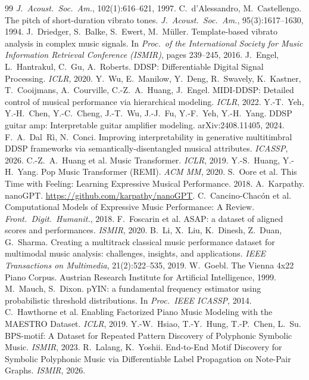\documentclass[11pt,a4paper]{report}
\begin{document}
\begin{thebibliography}{99}
\emph{J.\ Acoust.\ Soc.\ Am.}, 102(1):616--621, 1997.
 C.~d'Alessandro, M.~Castellengo.
The pitch of short-duration vibrato tones.
\emph{J.\ Acoust.\ Soc.\ Am.}, 95(3):1617--1630, 1994.
 J.~Driedger, S.~Balke, S.~Ewert, M.~M\"uller.
Template-based vibrato analysis in complex music signals.
In \emph{Proc.\ of the International Society for Music Information Retrieval
Conference (ISMIR)}, pages 239--245, 2016.
 J.~Engel, L.~Hantrakul, C.~Gu, A.~Roberts.
  DDSP: Differentiable Digital Signal Processing. \emph{ICLR}, 2020.
 Y.~Wu, E.~Manilow, Y.~Deng, R.~Swavely, K.~Kastner,
  T.~Cooijmans, A.~Courville, C.-Z.~A.~Huang, J.~Engel.
  MIDI-DDSP: Detailed control of musical performance via hierarchical
  modeling. \emph{ICLR}, 2022.
 Y.-T.~Yeh, Y.-H.~Chen, Y.-C.~Cheng, J.-T.~Wu,
  J.-J.~Fu, Y.-F.~Yeh, Y.-H.~Yang.
  DDSP guitar amp: Interpretable guitar amplifier modeling.
  arXiv:2408.11405, 2024.
 F.~A.~Dal~R\`i, N.~Conci.
  Improving interpretability in generative multitimbral DDSP frameworks
  via semantically-disentangled musical attributes. \emph{ICASSP}, 2026.
 C.-Z.~A.~Huang et al.
  Music Transformer. \emph{ICLR}, 2019.
 Y.-S.~Huang, Y.-H.~Yang.
  Pop Music Transformer (REMI). \emph{ACM MM}, 2020.
 S.~Oore et al.
  This Time with Feeling: Learning Expressive Musical Performance. 2018.
 A.~Karpathy. nanoGPT. \url{https://github.com/karpathy/nanoGPT}.
 C.~Cancino-Chac\'on et al.
  Computational Models of Expressive Music Performance: A Review.
  \emph{Front.\ Digit.\ Humanit.}, 2018.
 F.~Foscarin et al.
  ASAP: a dataset of aligned scores and performances. \emph{ISMIR}, 2020.
 B.~Li, X.~Liu, K.~Dinesh, Z.~Duan, G.~Sharma.
  Creating a multitrack classical music performance dataset for multimodal
  music analysis: challenges, insights, and applications. \emph{IEEE
  Transactions on Multimedia}, 21(2):522--535, 2019.
 W.~Goebl. The Vienna 4x22 Piano Corpus. Austrian
  Research Institute for Artificial Intelligence, 1999.
 M.~Mauch, S.~Dixon. pYIN: a fundamental frequency
  estimator using probabilistic threshold distributions. In \emph{Proc.\
  IEEE ICASSP}, 2014.
 C.~Hawthorne et al.
  Enabling Factorized Piano Music Modeling with the MAESTRO Dataset.
  \emph{ICLR}, 2019.
 Y.-W.~Hsiao, T.-Y.~Hung, T.-P.~Chen, L.~Su.
  BPS-motif: A Dataset for Repeated Pattern Discovery of Polyphonic Symbolic
  Music. \emph{ISMIR}, 2023.
 R.~Lalang, K.~Yoshii. End-to-End Motif Discovery
  for Symbolic Polyphonic Music via Differentiable Label Propagation on
  Note-Pair Graphs. \emph{ISMIR}, 2026.
\end{thebibliography}
\end{document}
